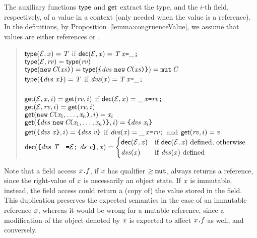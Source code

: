 The auxiliary functions $\textsf{type}$ and $\textsf{get}$ extract the type, and the $i$-th field, respectively, of a value in a context (only needed when the value is a reference). In the definitions, by Proposition~\ref{lemma:congruenceValue}, we assume that values are either references or \storableVals.
{\begin{small}
\begin{quote}
$\textsf{type}({\cal{E}},\mathit{x})=\mathit{T}$ if $\textsf{dec}({\cal{E}},\mathit{x})=\mathit{T}\,\mathit{x}\texttt{=}{\_}\texttt{;}$ \\
$\textsf{type}({\cal{E}},\mathit{rv})=\textsf{type}(\mathit{rv})$\\
$\textsf{type}(\texttt{new}\,\mathit{C}\!\texttt{(}\mathit{xs}\texttt{)})=\textsf{type}(\texttt{\{}\mathit{dvs}\ \texttt{new}\,\mathit{C}\!\texttt{(}\mathit{xs}\texttt{)}\texttt{\}})=\texttt{mut}\,\mathit{C}$\\
$\textsf{type}(\texttt{\{}\mathit{dvs}\ \mathit{x}\texttt{\}})=\mathit{T}$ if $\mathit{dvs}(\mathit{x})=\mathit{T}\,\mathit{x}\texttt{=}{\_}\texttt{;}$\\
\\
$\textsf{get}({\cal{E}},\mathit{x},i)=\textsf{get}({\mathit{rv}},i)$ if $\textsf{dec}({\cal{E}},\mathit{x})=\_\,\mathit{x}\texttt{=}{\mathit{rv}}\texttt{;}$\\
$\textsf{get}({\cal{E}},\mathit{rv},i)=\textsf{get}(\mathit{rv},i)$\\
{$\textsf{get}(\texttt{new}\,\mathit{C}\!\texttt{(}\mathit{x}_1,\ldots,\mathit{x}_n\texttt{)},i)=\mathit{x}_i$}\\
{$\textsf{get}(\texttt{\{}\mathit{dvs}\ \texttt{new}\,\mathit{C}\!\texttt{(}\mathit{x}_1,\ldots,\mathit{x}_n\texttt{)}\texttt{\}},i)=\texttt{\{}\mathit{dvs}\ \mathit{x}_i\texttt{\}}$}\\
{$\textsf{get}(\texttt{\{}\mathit{dvs}\ \mathit{x}\texttt{\}},i)=\texttt{\{}\mathit{dvs}\ \mathit{v}\texttt{\}}$ if $\mathit{dvs}(\mathit{x})=\_\,\mathit{x}\texttt{=}\mathit{rv}\texttt{;}$ and $\textsf{get}(\mathit{rv},i)=\mathit{v}$}
\\
$\extractDec{\Block{\dvs\ \Dec{\T}{\_}{\ctx}\ \decs}{\val}}{\x}=\begin{cases}
\extractDec{\ctx}{\x}&\mbox{if}\ \extractDec{\ctx}{\x}\ \mbox{defined, otherwise}\\
\dvs(\x)&\mbox{if}\ \dvs(\x)\ \mbox{defined}
\end{cases}$
\end{quote}
\end{small}}
Note that a field access $\mathit{x}\texttt{.}\mathit{f}$, if $\mathit{x}$ has qualifier $\geq\texttt{mut}$,  always returns a reference, since the right-value of $\mathit{x}$ is necessarily an object state.
If $\mathit{x}$ is immutable, instead, the field access could return a (copy of) the value stored in the field. This duplication preserves the expected semantics in the case of an immutable reference $\mathit{x}$, whereas it would be wrong for a mutable reference, since a modification of the object denoted by $\mathit{x}$ is expected to affect $\mathit{x}\texttt{.}\mathit{f}$ as well, and conversely.

